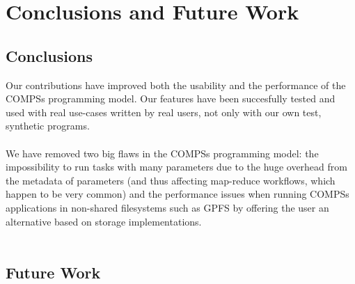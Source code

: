 \chapter{Conclusions and Future Work}
\section{Conclusions}
\label{subsec:conclusions}
Our contributions have improved both the usability and the performance of the COMPSs programming model. Our features have been succesfully tested and used with real use-cases written by real users, not only with  our own test, synthetic programs.\\
\\
We have removed two big flaws in the COMPSs programming model: the impossibility to run tasks with many parameters due to the huge overhead from the metadata of parameters (and thus affecting map-reduce workflows, which happen to be very common) and the performance issues when running COMPSs applications in non-shared filesystems such as GPFS by offering the user an alternative based on storage implementations.\\
\\


\section{Future Work}
\label{subsec:future_work}

